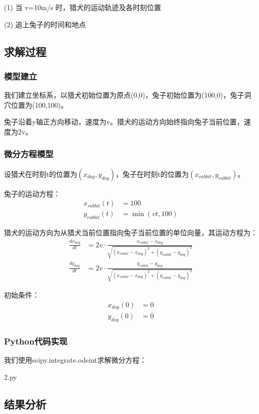 \documentclass[bwprint]{cumcmthesis}
\begin{document}
(1) 当 v=10m/s 时，猎犬的运动轨迹及各时刻位置

(2) 追上兔子的时间和地点

\subsection{求解过程}

\subsubsection{模型建立}
我们建立坐标系，以猎犬初始位置为原点(0,0)，兔子初始位置为(100,0)，兔子洞穴位置为(100,100)。

兔子沿着y轴正方向移动，速度为v。猎犬的运动方向始终指向兔子当前位置，速度为2v。

\subsubsection{微分方程模型}
设猎犬在时刻t的位置为$(x_{dog}, y_{dog})$，兔子在时刻t的位置为$(x_{rabbit}, y_{rabbit})$。

兔子的运动方程：
\begin{align}
x_{rabbit}(t) &= 100 \\
y_{rabbit}(t) &= \min(vt, 100)
\end{align}

猎犬的运动方向为从猎犬当前位置指向兔子当前位置的单位向量，其运动方程为：
\begin{align}
\frac{dx_{dog}}{dt} &= 2v \cdot \frac{x_{rabbit} - x_{dog}}{\sqrt{(x_{rabbit} - x_{dog})^2 + (y_{rabbit} - y_{dog})^2}} \\
\frac{dy_{dog}}{dt} &= 2v \cdot \frac{y_{rabbit} - y_{dog}}{\sqrt{(x_{rabbit} - x_{dog})^2 + (y_{rabbit} - y_{dog})^2}}
\end{align}

初始条件：
\begin{align}
x_{dog}(0) &= 0 \\
y_{dog}(0) &= 0
\end{align}

\subsubsection{Python代码实现}
我们使用scipy.integrate.odeint求解微分方程：

\noindent 2.py
    

\subsection{结果分析}
\end{document}
